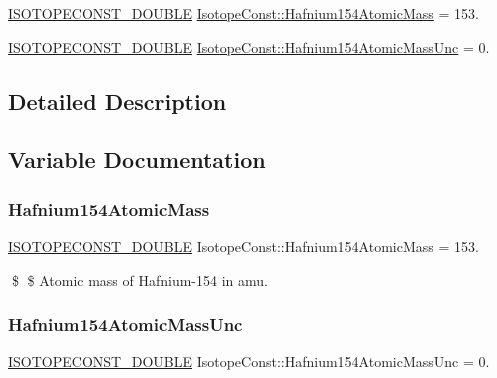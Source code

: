 \begin{DoxyCompactItemize}
\item 
\mbox{\hyperlink{group___isotope_const-_macros_ga8f45a7272ce02c0b4c65c44636ed719a}{I\+S\+O\+T\+O\+P\+E\+C\+O\+N\+S\+T\+\_\+\+D\+O\+U\+B\+LE}} \mbox{\hyperlink{group___isotope_const-_hafnium-_hf154_gab13185f94934e72c1ad0c3b556c0ac5e}{Isotope\+Const\+::\+Hafnium154\+Atomic\+Mass}} = 153.
\item 
\mbox{\hyperlink{group___isotope_const-_macros_ga8f45a7272ce02c0b4c65c44636ed719a}{I\+S\+O\+T\+O\+P\+E\+C\+O\+N\+S\+T\+\_\+\+D\+O\+U\+B\+LE}} \mbox{\hyperlink{group___isotope_const-_hafnium-_hf154_ga1cd883c313d5eb1bb110b0b903a6c578}{Isotope\+Const\+::\+Hafnium154\+Atomic\+Mass\+Unc}} = 0.
\end{DoxyCompactItemize}


\subsection{Detailed Description}


\subsection{Variable Documentation}
\mbox{\label{group___isotope_const-_hafnium-_hf154_gab13185f94934e72c1ad0c3b556c0ac5e}} 
\subsubsection{\texorpdfstring{Hafnium154\+Atomic\+Mass}{Hafnium154AtomicMass}}
{\footnotesize\ttfamily \mbox{\hyperlink{group___isotope_const-_macros_ga8f45a7272ce02c0b4c65c44636ed719a}{I\+S\+O\+T\+O\+P\+E\+C\+O\+N\+S\+T\+\_\+\+D\+O\+U\+B\+LE}} Isotope\+Const\+::\+Hafnium154\+Atomic\+Mass = 153.}

\$ \$ Atomic mass of Hafnium-\/154 in amu. \mbox{\label{group___isotope_const-_hafnium-_hf154_ga1cd883c313d5eb1bb110b0b903a6c578}} 
\subsubsection{\texorpdfstring{Hafnium154\+Atomic\+Mass\+Unc}{Hafnium154AtomicMassUnc}}
{\footnotesize\ttfamily \mbox{\hyperlink{group___isotope_const-_macros_ga8f45a7272ce02c0b4c65c44636ed719a}{I\+S\+O\+T\+O\+P\+E\+C\+O\+N\+S\+T\+\_\+\+D\+O\+U\+B\+LE}} Isotope\+Const\+::\+Hafnium154\+Atomic\+Mass\+Unc = 0.}

